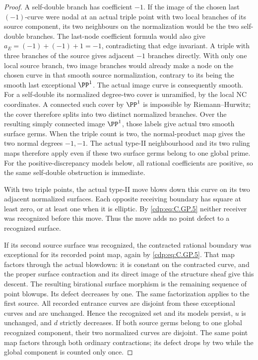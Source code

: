 \begin{proof}
A self-double branch has coefficient \(-1\).
If the image of the chosen last \((-1)\)-curve
were nodal at an actual triple point with two
local branches of its source component, its
two neighbours on the normalization would be
the two self-double branches. The last-node
coefficient formula would also give
\(a_E=(-1)+(-1)+1=-1\), contradicting that
edge invariant. A triple with three branches
of the source gives adjacent \(-1\) branches
directly. With only one local source branch,
two image branches would already make a node
on the chosen curve in that smooth source
normalization, contrary to its being the
smooth last exceptional \(\PP^1\).
The actual image curve is consequently
smooth. For a self-double its normalized
degree-two cover is unramified, by the local
NC coordinates. A connected such cover by
\(\PP^1\) is impossible by Riemann--Hurwitz;
the cover therefore splits into two distinct
normalized branches. Over the resulting
simply connected image \(\PP^1\), those
labels give actual two smooth surface germs.
When the triple count is two, the normal-product
map gives the two normal degrees \(-1,-1\).
The actual type-II neighbourhood and its two
ruling maps therefore apply even if these
two surface germs belong to one global prime.
For the positive-discrepancy models below,
all rational coefficients are positive, so
the same self-double obstruction is immediate.

With two triple points, the actual type-II move
blows down this curve on its two adjacent
normalized surfaces. Each opposite receiving
boundary has square at least zero, or at least
one when it is elliptic. By \eqref{cdp:eq:C.GP.5} neither
receiver was recognized before this move. Thus
the move adds no point defect to a recognized
surface.

If its second source surface was recognized,
the contracted rational boundary was exceptional
for its recorded point map, again by \eqref{cdp:eq:C.GP.5}.
That map factors through the actual blowdown:
it is constant on the contracted curve, and
the proper surface contraction and its direct
image of the structure sheaf give this descent.
The resulting birational surface morphism is
the remaining sequence of point blowups. Its
defect decreases by one. The same factorization
applies to the first source. All recorded
entrance curves are disjoint from these
exceptional curves and are unchanged. Hence
the recognized set and its models persist,
\(u\) is unchanged, and \(d\) strictly decreases.
If both source germs belong to one global
recognized component, their two normalized
curves are disjoint. The same point map
factors through both ordinary contractions;
its defect drops by two while the global
component is counted only once.


\end{proof}

